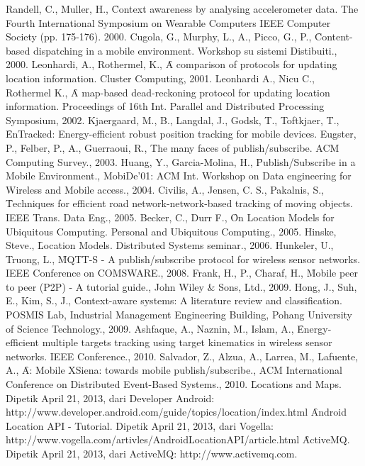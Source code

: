 \begin{thebibliography}{100}
    \setlength{\itemindent}{-1cm}
    \setlength\itemsep{0pt}
    \setlength{\parskip}{0pt}

     Randell, C., Muller, H., \f{Context awareness by analysing accelerometer
        data}. The Fourth International Symposium on Wearable Computers IEEE Computer
        Society (pp. 175-176). 2000.
     Cugola, G., Murphy, L., A., Picco, G., P., \f{Content-based 
        dispatching in a mobile environment}. Workshop su
        sistemi Distibuiti., 2000.
     Leonhardi, A., Rothermel, K., \f{A comparison of protocols for updating
        location information}. Cluster Computing, 2001.
     Leonhardi A., Nicu C., Rothermel K., \f{A map-based dead-reckoning
        protocol for updating location information}. Proceedings of 16th Int. Parallel and
        Distributed Processing Symposium, 2002.
     Kjaergaard, M., B., Langdal, J., Godsk, T., Toftkjaer, T., \f{EnTracked:
        Energy-efficient robust position tracking for mobile devices}. 
     Eugster, P., Felber, P., A., Guerraoui, R., \f{The many faces of
        publish/subscribe}. ACM Computing Survey., 2003.
     Huang, Y., Garcia-Molina, H., \f{Publish/Subscribe in a Mobile 
        Environment}., MobiDe'01: ACM Int.
        Workshop on Data engineering for Wireless and Mobile access., 2004.
     Civilis, A., Jensen, C. S., Pakalnis, S., \f{Techniques for efficient
        road network-network-based tracking of moving objects}. IEEE Trans. Data Eng., 2005.
     Becker, C., Durr F., \f{On Location Models for Ubiquitous Computing}.
        Personal and Ubiquitous Computing., 2005.
     Hinske, Steve., \f{Location Models}. Distributed Systems seminar., 2006.
     Hunkeler, U., Truong, L., \f{MQTT-S - A publish/subscribe protocol
        for wireless sensor networks}. IEEE Conference on COMSWARE., 2008.
     Frank, H., P., Charaf, H., \f{Mobile peer to peer (P2P) - A tutorial guide}.,
        John Wiley \& Sons, Ltd., 2009.
     Hong, J., Suh, E., Kim, S., J., \f{Context-aware systems: A literature
        review and classification}. POSMIS Lab, Industrial Management Engineering Building,
        Pohang University of Science Technology., 2009.
     Ashfaque, A., Naznin, M., Islam, A., \f{Energy-efficient multiple
        targets tracking using target kinematics in wireless sensor networks}. IEEE
        Conference., 2010.
     Salvador, Z., Alzua, A., Larrea, M., Lafuente, A., 
        \f{A: Mobile XSiena: towards mobile publish/subscribe}., ACM
        International Conference on Distributed Event-Based Systems., 2010.
     \f{Locations and Maps}. Dipetik April 21, 2013, dari Developer Android:
        http://www.developer.android.com/guide/topics/location/index.html
     \f{Android Location API - Tutorial}. Dipetik April 21, 2013, dari Vogella:
        http://www.vogella.com/artivles/AndroidLocationAPI/article.html
     \f{ActiveMQ}. Dipetik April 21, 2013, dari ActiveMQ:
        http://www.activemq.com.

\end{thebibliography}
